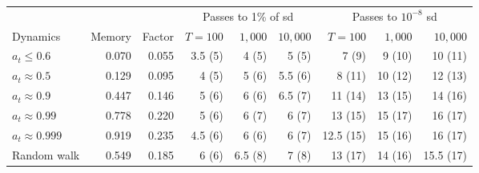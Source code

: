\small
\begin{tabular}{@{}lrrrrrrrr@{}}
\toprule
 & & & \multicolumn{3}{c}{Passes to 1\% of sd} & \multicolumn{3}{c}{Passes to $10^{-8}$ sd} \\
\cmidrule(lr){4-6} \cmidrule(l){7-9}
Dynamics & Memory & Factor & $T = 100$ & $1{,}000$ & $10{,}000$ & $T = 100$ & $1{,}000$ & $10{,}000$ \\
\midrule
$a_t \le 0.6$ & 0.070 & 0.055 & 3.5 (5) & 4 (5) & 5 (5) & 7 (9) & 9 (10) & 10 (11) \\
$a_t \approx 0.5$ & 0.129 & 0.095 & 4 (5) & 5 (6) & 5.5 (6) & 8 (11) & 10 (12) & 12 (13) \\
$a_t \approx 0.9$ & 0.447 & 0.146 & 5 (6) & 6 (6) & 6.5 (7) & 11 (14) & 13 (15) & 14 (16) \\
$a_t \approx 0.99$ & 0.778 & 0.220 & 5 (6) & 6 (7) & 6 (7) & 13 (15) & 15 (17) & 16 (17) \\
$a_t \approx 0.999$ & 0.919 & 0.235 & 4.5 (6) & 6 (6) & 6 (7) & 12.5 (15) & 15 (16) & 16 (17) \\
Random walk & 0.549 & 0.185 & 6 (6) & 6.5 (8) & 7 (8) & 13 (17) & 14 (16) & 15.5 (17) \\
\bottomrule
\end{tabular}

